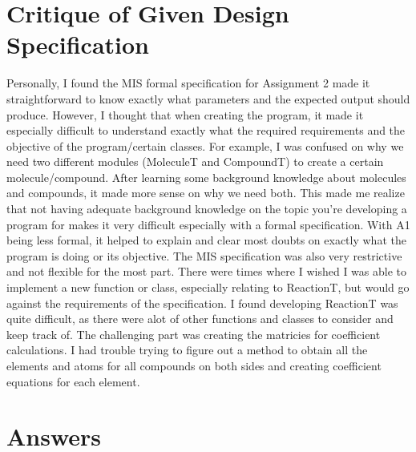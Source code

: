 \documentclass[12pt]{article}
\begin{document}
\section{Critique of Given Design Specification}
Personally, I found the MIS formal specification for Assignment 2 made it straightforward to know exactly what parameters and the expected output should produce. However, I thought that when creating the program, it made it especially difficult to understand exactly what the required requirements and the objective of the program/certain classes. For example, I was confused on why we need two different modules (MoleculeT and CompoundT) to create a certain molecule/compound. After learning some background knowledge about molecules and compounds, it made more sense on why we need both. \newline This made me realize that not having adequate background knowledge on the topic you're developing a program for makes it very difficult especially with a formal specification. With A1 being less formal, it helped to explain and clear most doubts on exactly what the program is doing or its objective. The MIS specification was also very restrictive and not flexible for the most part. There were times where I wished I was able to implement a new function or class, especially relating to ReactionT, but would go against the requirements of the specification.
\newline
I found developing ReactionT was quite difficult, as there were alot of other functions and classes to consider and keep track of. The challenging part was creating the matricies for coefficient calculations. I had trouble trying to figure out a method to obtain all the elements and atoms for all compounds on both sides and creating coefficient equations for each element.  

\section{Answers}
\end{document}

